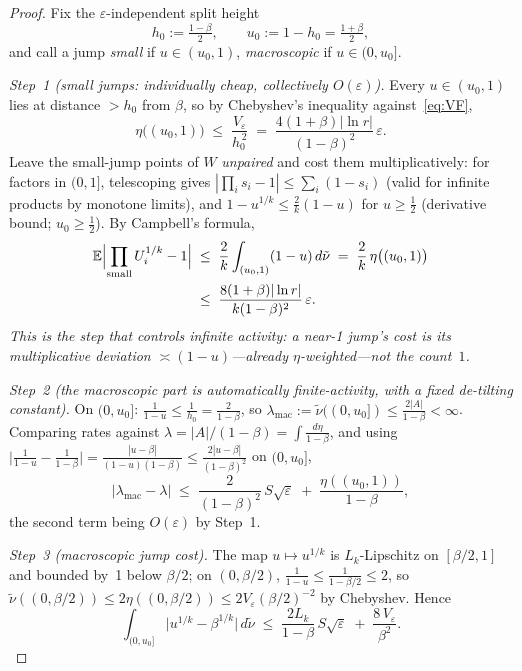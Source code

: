 \documentclass[pdflatex,sn-mathphys-num]{sn-jnl}
\theoremstyle{thmstyleone}
\theoremstyle{thmstyletwo}
\theoremstyle{thmstylethree}
\begin{document}
\begin{proof}
Fix the $\varepsilon$-independent split height
\[
  h_0 := \tfrac{1-\beta}{2},
  \qquad
  u_0 := 1 - h_0 = \tfrac{1+\beta}{2},
\]
and call a jump \emph{small} if $u \in (u_0, 1)$, \emph{macroscopic}
if $u \in (0, u_0]$.

\textit{Step~1 (small jumps: individually cheap, collectively
$O(\varepsilon)$).}  Every $u \in (u_0,1)$ lies at distance
$> h_0$ from $\beta$, so by Chebyshev's inequality
against~\eqref{eq:VF},
\[
  \eta\bigl((u_0,1)\bigr) \;\le\; \frac{V_\varepsilon}{h_0^{\,2}}
  \;=\; \frac{4(1+\beta)|\ln r|}{(1-\beta)^2}\,\varepsilon .
\]
Leave the small-jump points of $W$ \emph{unpaired} and cost them
multiplicatively: for factors in $(0,1]$, telescoping gives
$|\prod_i s_i - 1| \le \sum_i(1-s_i)$ (valid for infinite products
by monotone limits), and $1 - u^{1/k} \le \tfrac2k(1-u)$ for $u \ge
\tfrac12$ (derivative bound; $u_0 \ge \tfrac12$).  By Campbell's
formula,
\[
\begin{aligned}
  \mathbb{E}\Bigl|\prod_{\text{small}} U_i^{1/k} - 1\Bigr|
  \;&\le\; \frac2k\int_{(u_0,1)}(1-u)\,d\tilde\nu
  \;=\; \frac2k\,\eta\bigl((u_0,1)\bigr)\\
  \;&\le\; \frac{8(1+\beta)|\ln r|}{k(1-\beta)^2}\,\varepsilon .
\end{aligned}
\]
\emph{This is the step that controls infinite activity: a near-1
jump's cost is its multiplicative deviation $\asymp(1-u)$---already
$\eta$-weighted---not the count~$1$.}

\textit{Step~2 (the macroscopic part is automatically
finite-activity, with a fixed de-tilting constant).}  On $(0,u_0]$:
$\tfrac1{1-u} \le \tfrac1{h_0} = \tfrac2{1-\beta}$, so
$\lambda_{\mathrm{mac}} := \tilde\nu((0,u_0]) \le
\tfrac{2|A|}{1-\beta} < \infty$.  Comparing rates against
$\lambda = |A|/(1-\beta) = \int\tfrac{d\eta}{1-\beta}$, and using
$\bigl|\tfrac1{1-u} - \tfrac1{1-\beta}\bigr| =
\tfrac{|u-\beta|}{(1-u)(1-\beta)} \le
\tfrac{2|u-\beta|}{(1-\beta)^2}$ on $(0,u_0]$,
\[
  \bigl|\lambda_{\mathrm{mac}} - \lambda\bigr|
  \;\le\; \frac{2}{(1-\beta)^2}\,S\sqrt{\varepsilon}
  \;+\; \frac{\eta((u_0,1))}{1-\beta},
\]
the second term being $O(\varepsilon)$ by Step~1.

\textit{Step~3 (macroscopic jump cost).}  The map $u \mapsto
u^{1/k}$ is $L_k$-Lipschitz on $[\beta/2,1]$ and bounded by~1
below $\beta/2$; on $(0,\beta/2)$, $\tfrac1{1-u} \le
\tfrac1{1-\beta/2} \le 2$, so
$\tilde\nu((0,\beta/2)) \le 2\eta((0,\beta/2)) \le
2V_\varepsilon(\beta/2)^{-2}$ by Chebyshev.  Hence
\[
  \int_{(0,u_0]}\bigl|u^{1/k} - \beta^{1/k}\bigr|\,d\tilde\nu
  \;\le\; \frac{2L_k}{1-\beta}\,S\sqrt{\varepsilon}
  \;+\; \frac{8\,V_\varepsilon}{\beta^2}.
\]


\end{proof}
\end{document}
